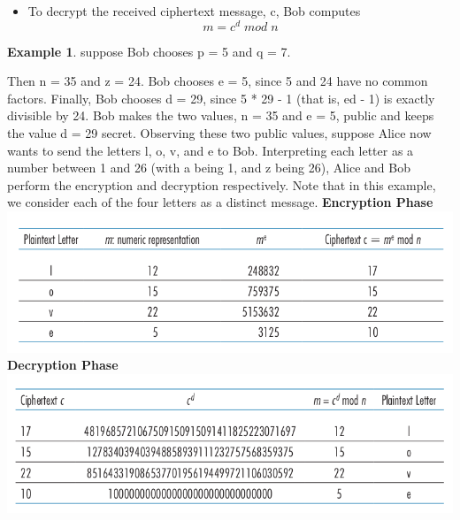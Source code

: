 \documentclass{report}
\theoremstyle{definition}
\newtheorem{exmp}{Example}[section]
\begin{document}
{{{{\begin{itemize}
\item{To decrypt the received ciphertext message, c, Bob computes
$$m=c^d\;mod\;n$$}
\end{itemize}

\begin{exmp}
suppose Bob chooses p = 5 and q = 7.
\end{exmp}
Then n = 35 and z = 24. Bob chooses
e = 5, since 5 and 24 have no common factors. Finally, Bob chooses d = 29, since
5 * 29 - 1 (that is, ed - 1) is exactly divisible by 24. Bob makes the two values, n = 35
and e = 5, public and keeps the value d = 29 secret. Observing these two public
values, suppose Alice now wants to send the letters l, o, v, and e to Bob. Interpreting
each letter as a number between 1 and 26 (with a being 1, and z being 26), Alice and
Bob perform the encryption and decryption respectively.
Note that in this example, we consider each of the four letters as a distinct message.\newline
\newline
\bf{Encryption Phase}\newline
\includegraphics[scale=0.5]{Rsatab}\newline
\bf{Decryption Phase}\newline
\includegraphics[scale=.5]{drcp}\newline
}\newpage
}}}
\end{document}
